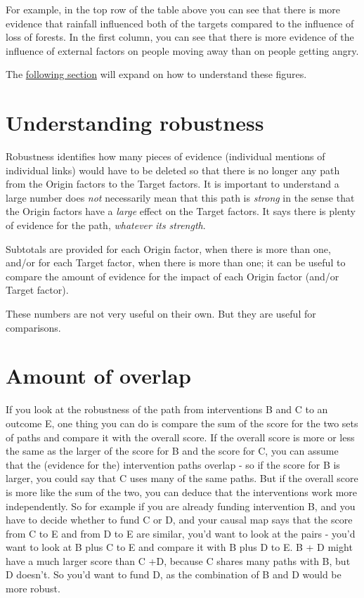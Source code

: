 \documentclass[
]{book}
\begin{document}
For example, in the top row of the table above you can see that there is more evidence that rainfall influenced both of the targets compared to the influence of loss of forests. In the first column, you can see that there is more evidence of the influence of external factors on people moving away than on people getting angry.

The \protect\hyperlink{howtoanalyseobustness}{following section} will expand on how to understand these figures.

\hypertarget{analysingrobustness}{%
\section{Understanding robustness}\label{analysingrobustness}}

Robustness identifies how many pieces of evidence (individual mentions of individual links) would have to be deleted so that there is no longer any path from the Origin factors to the Target factors. It is important to understand a large number does \emph{not} necessarily mean that this path is \emph{strong} in the sense that the Origin factors have a \emph{large} effect on the Target factors. It says there is plenty of evidence for the path, \emph{whatever its strength}.

Subtotals are provided for each Origin factor, when there is more than one, and/or for each Target factor, when there is more than one; it can be useful to compare the amount of evidence for the impact of each Origin factor (and/or Target factor).

These numbers are not very useful on their own. But they are useful for comparisons.

\hypertarget{amount-of-overlap}{%
\section{Amount of overlap}\label{amount-of-overlap}}

If you look at the robustness of the path from interventions B and C to an outcome E, one thing you can do is compare the sum of the score for the two sets of paths and compare it with the overall score. If the overall score is more or less the same as the larger of the score for B and the score for C, you can assume that the (evidence for the) intervention paths overlap - so if the score for B is larger, you could say that C uses many of the same paths. But if the overall score is more like the sum of the two, you can deduce that the interventions work more independently. So for example if you are already funding intervention B, and you have to decide whether to fund C or D, and your causal map says that the score from C to E and from D to E are similar, you'd want to look at the pairs - you'd want to look at B plus C to E and compare it with B plus D to E. B + D might have a much larger score than C +D, because C shares many paths with B, but D doesn't. So you'd want to fund D, as the combination of B and D would be more robust.
\end{document}
